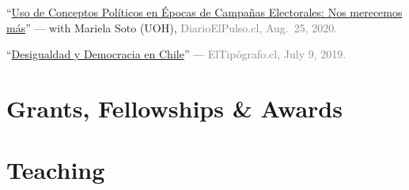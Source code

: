 \documentclass[letterpaper]{article}
\renewenvironment{itemize}{
  \begin{list}{}{
    \setlength{\leftmargin}{1.5em}
  }
}{
  \end{list}
}
\begin{document}
\begin{itemize}
  \item[\textcolor{gray}{\textbullet}] ``\href{https://www.diarioelpulso.cl/2020/08/25/uso-de-conceptos-politicos-en-epocas-de-campanas-electorales-nos-merecemos-mas/}{Uso de Conceptos Pol\'iticos en \'Epocas de Campa\~nas Electorales: Nos merecemos m\'as}'' — with Mariela Soto (UOH), \textcolor{gray}{DiarioElPulso.cl, Aug.\ 25, 2020.}

  \item[\textcolor{gray}{\textbullet}] ``\href{https://eltipografo.cl/2019/07/desigualdad-y-democracia-en-chile}{Desigualdad y Democracia en Chile}'' — \textcolor{gray}{ElTip\'ografo.cl, July 9, 2019.}

\end{itemize}

\section*{Grants, Fellowships \& Awards}
{\unskip}



\section*{Teaching}

{\unskip}


{\unskip}

\end{document}
